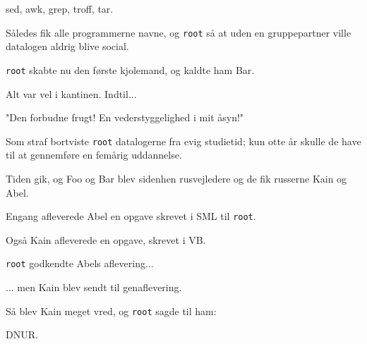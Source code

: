 \documentclass[a4paper,11pt]{article}
\begin{document}
\begin{sketch}
  
   sed, awk, grep, troff, tar.

   Således fik alle programmerne navne, og \texttt{root} så at uden en
  gruppepartner ville datalogen aldrig blive social.
  
   \texttt{root} skabte nu den første kjolemand, og kaldte ham Bar.


  
   Alt var vel i kantinen.  Indtil...  


   "Den forbudne frugt!  En vederstyggelighed i mit åsyn!"  

   Som straf bortviste \texttt{root} datalogerne fra evig studietid;
  kun otte år skulle de have til at gennemføre en femårig uddannelse.

  Tiden gik, og Foo og Bar blev sidenhen rusvejledere og de
  fik russerne Kain og Abel.


   Engang afleverede Abel en opgave skrevet i SML til
  \texttt{root}.  


   Også Kain afleverede en opgave, skrevet i VB.


  \texttt{root} godkendte Abels aflevering...


  ... men Kain blev sendt til genaflevering.  


   Så blev Kain meget vred, og \texttt{root} sagde til ham:

   DNUR.


\end{sketch}
\end{document}
